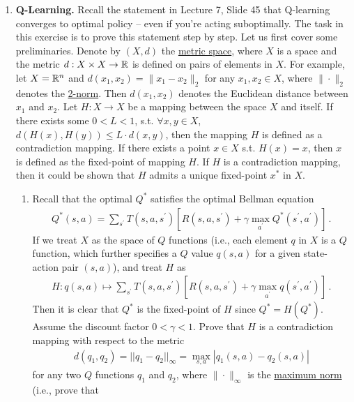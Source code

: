 \documentclass{article}
\begin{document}
\begin{enumerate}
    \item \textbf{Q-Learning.}
Recall the statement in Lecture 7, Slide 45 that Q-learning converges to optimal policy -- even if you're acting suboptimally. The task in this exercise is to prove this statement step by step. Let us first cover some preliminaries. Denote by $(X,d)$ the \href{https://en.wikipedia.org/wiki/Metric_space}{metric space}, where $X$ is a space and the metric $d:X\times X\to {\mathbb{R}}$ is defined on pairs of elements in $X$. For example, let $X={\mathbb{R}}^n$ and
$d(x_1,x_2)=\|x_1-x_2\|_2$ for any $x_1, x_2 \in X$, where $\|\cdot\|_2$ denotes the \href{https://en.wikipedia.org/wiki/Norm_(mathematics)#Euclidean_norm}{2-norm}. Then
$d(x_1,x_2)$ denotes the Euclidean distance between $x_1$ and $x_2$. Let $H:X\to X $ be a mapping between 
the space $X$ and itself. If there exists some $0<L<1$, s.t. $\forall x,y\in X$, $d(H(x),H(y))\leq L\cdot
d(x,y)$, then the mapping $H$ is defined as a contradiction mapping. If there exists a point $x\in X$
s.t. $H(x)=x$, then $x$ is defined as the fixed-point of mapping $H$. If $H$ is a contradiction mapping,
then it could be shown that $H$ admits a unique fixed-point $x^\ast$ in $X$. 
\begin{enumerate}
    \item 	Recall that the optimal $Q^\ast$ satisfies the optimal Bellman equation
    \begin{align*}
        Q^{*}(s, a)=\sum_{s^{\prime}} T\left(s, a, s^{\prime}\right)\left[R\left(s, a, s^{\prime}\right)+\gamma \max _{a^{\prime}} Q^{*}\left(s^{\prime}, a^{\prime}\right)\right]\,.
    \end{align*}
    If we treat $X$ as the space of $Q$ functions (i.e., each element $q$ in $X$ is a $Q$ function, which further specifies a $Q$ value $q(s,a)$ for a given state-action pair $(s,a)$), and treat $H$ as
    \begin{align*}
        H:q(s,a)\mapsto \sum_{s^{\prime}} T\left(s, a, s^{\prime}\right)\left[R\left(s, a, s^{\prime}\right)+\gamma\max_{a^\prime} q\left(s^{\prime},a^\prime\right)\right]\,.
    \end{align*}
    Then it is clear that $Q^\ast$ is the fixed-point of $H$ since 
    $Q^\ast=H(Q^\ast)$.
    Assume the discount factor $0<\gamma<1$. Prove that $H$ is a contradiction mapping with respect to the metric
    \begin{align*}
        d(q_1,q_2)=||q_1-q_2||_{\infty}=\max_{s,a}|q_1(s,a)-q_2(s,a)|
    \end{align*}
    for any two $Q$ functions $q_1$ and $q_2$, where $\|\cdot\|_\infty$ is the \href{https://en.wikipedia.org/wiki/Norm_(mathematics)#Maximum_norm_(special_case_of:_infinity_norm,_uniform_norm,_or_supremum_norm)}{maximum norm}  (i.e., prove that

\end{enumerate}
\end{enumerate}
\end{document}
